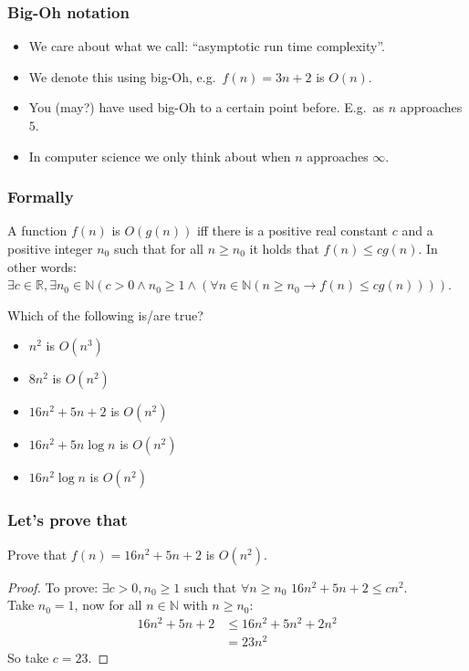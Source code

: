 \begin{frame}
	\frametitle{Big-Oh notation}

	\begin{itemize}
		\item We care about what we call: ``asymptotic run time complexity''.
		\item We denote this using big-Oh, e.g.\ $f(n) = 3n + 2$ is $O(n)$.

		\item You (may?) have used big-Oh to a certain point before. E.g.\ as $n$ approaches $5$.
			
		\item In computer science we only think about when $n$ approaches $\infty$.
	\end{itemize}
\end{frame}

\begin{frame}
	\frametitle{Formally}
	\begin{definition}[Big-Oh]
		A function $f(n)$ is $O(g(n))$ iff there is a positive real constant $c$ and a positive integer $n_0$ such that for
		all $n \geq n_0$ it holds that $f(n) \leq c g(n)$. In other words:\\
		$\exists c \in \mathbb{R}, \exists n_0 \in \mathbb{N} (c > 0 \wedge n_0 \geq 1 \wedge (\forall n \in \mathbb{N} (n
		\geq n_0 \to f(n) \leq cg(n))))$.
	\end{definition}
	
		Which of the following is/are true?
		\begin{itemize}
			\item $n^2$ is $O(n^3)$
			\item $8n^2$ is $O(n^2)$
			\item $16n^2 + 5n + 2$ is $O(n^2)$
			\item $16n^2 + 5n \log n$ is $O(n^2)$
			\item $16n^2\log n$ is $O(n^2)$
		\end{itemize}
\end{frame}

\begin{frame}
	\frametitle{Let's prove that}

		Prove that $f(n) = 16n^2 + 5n + 2$ is $O(n^2)$.
	
	\begin{proof}
		To prove: $\exists c > 0, n_0 \geq 1$ such that $\forall n \geq n_0$ $16n^2 + 5n + 2 \leq cn^2$.\\
		
		Take $n_0 = 1$, now for all $n \in \mathbb{N}$ with $n \geq n_0$:
		\begin{align*}
			16n^2 + 5n + 2 &\leq 16n^2 + 5n^2 + 2n^2 \\
										 &= 23n^2
		\end{align*}
		So take $c=23$.
	\end{proof}
\end{frame}

